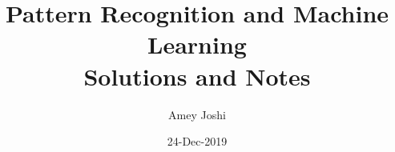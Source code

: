 \documentclass{report}
\title{Pattern Recognition and Machine Learning \\ Solutions and Notes}
\author{Amey Joshi}
\date{24-Dec-2019}
\begin{document}
\begin{titlepage}
\maketitle
\thispagestyle{empty}
\end{titlepage}

\tableofcontents
\thispagestyle{empty}

%


\theoremstyle{plain}
\newtheorem{thm}{Theorem}[section]

\theoremstyle{plain}
\newtheorem{prop}{Proposition}[section]

\theoremstyle{plain}
\newtheorem{lem}{Lemma}[section]

\theoremstyle{plain}
\newtheorem{corr}{Corollary}[section]

\theoremstyle{definition}
\newtheorem{defn}{Definition}[section]

\theoremstyle{remark}
\newtheorem*{rem}{Remark}


%
%
\end{document}
